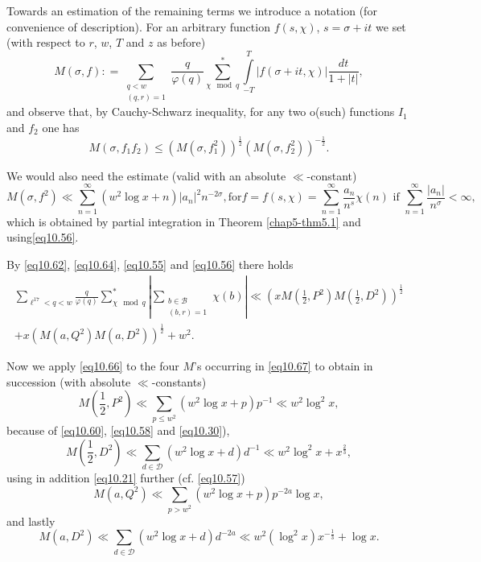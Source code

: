 Towards an estimation of the remaining terms we introduce a notation
(for convenience of description). For an arbitrary function $f (s,
\chi )$, $s = \sigma + it$ we  set (with respect to $r$, $w$, $T$ and $z$ as
before) 
\begin{equation*}
M (\sigma , f) : = \sum_{\substack{q < w \\ (q, r)=1}}
\frac{q}{\varphi (q)} \sum^*_{\chi \mod q} \int\limits_{-T}^{T} |f
(\sigma + it , \chi )| \frac{dt}{1+|t|}, \tag{10.64}\label{eq10.64} 
\end{equation*}
and observe that, by Cauchy-Schwarz inequality, for any two o(such)
functions $I_1$ and $f_2$ one has 
\begin{equation*}
M(\sigma,  f_1 f_2)\leq (M (\sigma, f_1^2 ))^{\frac{1}{2}} (M (\sigma,
f^2_2))^{-\frac{1}{2}}. \tag{10.65}\label{eq10.65} 
\end{equation*}

We would also need the estimate (valid with an absolute $\ll$-constant)
{\fontsize{9pt}{11pt}\selectfont
\begin{equation*}
M(\sigma, f^2)\ll \sum_{n=1}^{\infty}(w^2 \log x + n)|a_n|^2 n
^{-2\sigma}, \text{for} f=f(s,\chi )= \sum_{n=1}^{\infty}
\frac{a_n}{n^s}\chi(n) \text{ if } \sum_{n=1}^{\infty} \frac{|a_n|}{n ^\sigma}
< \infty, \tag{10.66}\label{eq10.66} 
\end{equation*}}\relax\pageoriginale
which is obtained by partial integration in Theorem \ref{chap5-thm5.1}
and using\break \eqref{eq10.56}. 

By \eqref{eq10.62}, \eqref{eq10.64}, \eqref{eq10.55} and
\eqref{eq10.56} there holds 
\begin{gather*}
\sum_{\ell^{17}<q<w} \frac{q}{\varphi (q)} \sum^*_{\chi \mod
  q}|\sum_{\substack{b \in \mathscr{B} \\ (b,r)=1}} \chi(b) | \ll (x
M(\frac{1}{2}, P^2 ) M (\frac{1}{2}, D^2))^{\frac{1}{2}}\\
+ x (M (a ,
Q^2) M (a, D^2 ))^{\frac{1}{2}}+w^2. \tag{10.67}\label{eq10.67} 
\end{gather*}

Now we apply \eqref{eq10.66} to the four $M$'s occurring in
\eqref{eq10.67} to obtain in succession (with absolute $\ll$-constants) 
\begin{equation*}
M(\frac{1}{2} , P^2)\ll \sum_{p \leq w^2} (w^2 \log x + p)p^{-1} \ll
w^2 \log^2 x, \tag{10.68}\label{eq10.68} 
\end{equation*}
because of \eqref{eq10.60}, \eqref{eq10.58} and \eqref{eq10.30}),
\begin{equation*}
M(\frac{1}{2}, D^2) \ll \sum_{d \in \mathscr{D}} (w^2 \log x +d)d^{-1} \ll
w^2 \log^2 x+ x^{\frac{2}{3}}, \tag{10.69}\label{eq10.69} 
\end{equation*}
using in addition \eqref{eq10.21} further (cf. \eqref{eq10.57})
\begin{equation*}
M(a, Q^2) \ll \sum_{p > w^2} (w^2 \log x +p)p^{-2a} \log x,
\tag{10.70}\label{eq10.70} 
\end{equation*}
and lastly 
\begin{equation*}
M(a, D^2) \ll \sum_{d \in \mathscr{D}} (w^2 \log x +d)d^{-2a} \ll w^2
(\log^2 x) x^{-\frac{1}{3}}+ \log x. \tag{10.71}\label{eq10.71} 
\end{equation*}


